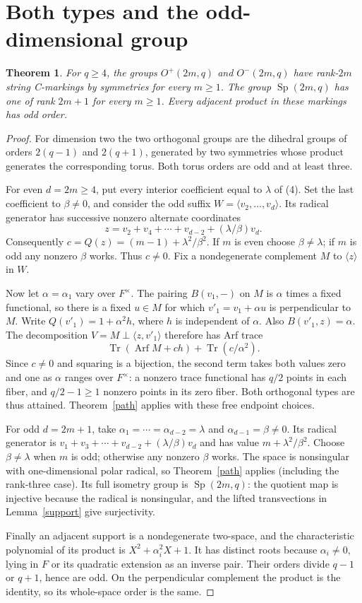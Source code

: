 \documentclass[11pt,a4paper]{article}
\newtheorem{theorem}{Theorem}
\newcommand{\gen}[1]{\langle#1\rangle}
\newcommand{\Sp}{\operatorname{Sp}}
\newcommand{\Tr}{\operatorname{Tr}}
\begin{document}
\section{Both types and the odd-dimensional group}
\begin{theorem}\label{types}
For $q\geq4$, the groups $O^+(2m,q)$ and $O^-(2m,q)$ have
rank-$2m$ string C-markings by symmetries for every $m\geq1$.
The group $\Sp(2m,q)$ has one of rank $2m+1$ for every $m\geq1$.
Every adjacent product in these markings has odd order.
\end{theorem}
\begin{proof}
For dimension two the two orthogonal groups are the dihedral groups
of orders $2(q-1)$ and $2(q+1)$, generated by two symmetries whose
product generates the corresponding torus. Both torus orders are
odd and at least three.

For even $d=2m\geq4$, put every interior coefficient equal to
$\lambda$ of (4). Set the last coefficient to $\beta\ne0$,
and consider the odd suffix $W=\gen{v_2,\ldots,v_d}$.
Its radical generator has successive nonzero alternate coordinates
\[
                    z=v_2+v_4+\cdots+v_{d-2}
                              +(\lambda/\beta)v_d.
\]
Consequently $c=Q(z)=(m-1)+\lambda^2/\beta^2$.
If $m$ is even choose $\beta\ne\lambda$; if $m$ is odd any
nonzero $\beta$ works. Thus $c\ne0$.
Fix a nondegenerate complement $M$ to $\gen z$ in $W$.

Now let $\alpha=\alpha_1$ vary over $F^\times$.
The pairing $B(v_1,-)$ on $M$ is $\alpha$ times a fixed
functional, so there is a fixed $u\in M$ for which
$v'_1=v_1+\alpha u$ is perpendicular to $M$.
Write $Q(v'_1)=1+\alpha^2 h$, where $h$ is independent of
$\alpha$. Also $B(v'_1,z)=\alpha$.
The decomposition
$V=M\perp\gen{z,v'_1}$ therefore has Arf trace
\[
 \Tr(\operatorname{Arf} M+ch)+\Tr(c/\alpha^2).        \tag{5}
\]
Since $c\ne0$ and squaring is a bijection, the second term
takes both values zero and one as $\alpha$ ranges over
$F^\times$: a nonzero trace functional has $q/2$ points in
each fiber, and $q/2-1\geq1$ nonzero points in its zero fiber.
Both orthogonal types are thus attained. Theorem~\ref{path}
applies with these free endpoint choices.

For odd $d=2m+1$, take $\alpha_1=\cdots=\alpha_{d-2}=\lambda$
and $\alpha_{d-1}=\beta\ne0$. Its radical generator is
$v_1+v_3+\cdots+v_{d-2}+(\lambda/\beta)v_d$ and has value
$m+\lambda^2/\beta^2$. Choose $\beta\ne\lambda$ when $m$
is odd; otherwise any nonzero $\beta$ works.
The space is nonsingular with one-dimensional polar radical,
so Theorem~\ref{path} applies (including the rank-three case).
Its full isometry group is $\Sp(2m,q)$: the quotient map is
injective because the radical is nonsingular, and the lifted
transvections in Lemma~\ref{support} give surjectivity.

Finally an adjacent support is a nondegenerate two-space, and
the characteristic polynomial of its product is
$X^2+\alpha_i^2X+1$. It has distinct roots because
$\alpha_i\ne0$, lying in $F$ or its quadratic extension
as an inverse pair. Their orders divide $q-1$ or $q+1$,
hence are odd. On the perpendicular complement the product
is the identity, so its whole-space order is the same.
\end{proof}
\end{document}
